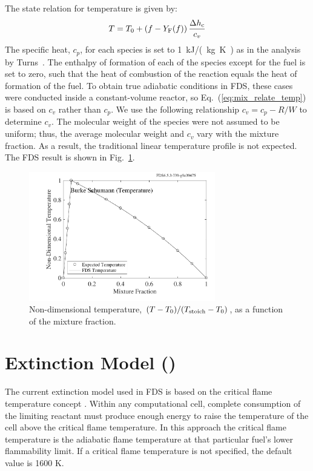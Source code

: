 \documentclass[11pt]{book}
\begin{document}
The state relation for temperature is given by:
\begin{equation}\label{eq:mix_relate_temp}
T = T_0 +  (f-Y_{\rm F}(f)) \, \frac{\Delta h_{\rm c}}{c_{v}}
\end{equation}
The specific heat, $c_p$, for each species is set to 1~\si{kJ/(kg.K)} as in the analysis by Turns~\cite{Turns:1996}. The enthalpy of formation of each of the species except for the fuel is set to zero, such that the heat of combustion of the reaction equals the heat of formation of the fuel. To obtain true adiabatic conditions in FDS, these cases were conducted inside a constant-volume reactor, so Eq.~(\ref{eq:mix_relate_temp}) is based on $c_v$ rather than $c_p$. We use the  following relationship $c_v = c_p - R/W$ to determine $c_v$. The molecular weight of the species were not assumed to be uniform; thus, the average molecular weight and $c_v$ vary with the mixture fraction. As a result, the traditional linear temperature profile is not expected.  The FDS result is shown in Fig.~\ref{fig:burke_schumann_temp}.
\begin{figure}
\begin{center}
\includegraphics[width=3.2in]{SCRIPT_FIGURES/burke_schumann_temp}
\end{center}
\caption[Mixture fraction state relation for temperature ()]{Non-dimensional temperature, $(T-T_0)/(T_{\rm stoich} - T_0)$, as a function of the mixture fraction.}
\label{fig:burke_schumann_temp}
\end{figure}


\clearpage

\section{Extinction Model ()}
\label{Extinct}

The current extinction model used in FDS is based on the critical flame temperature concept \cite{SFPE:Beyler}. Within any computational cell, complete consumption of the limiting reactant must produce enough energy to raise the temperature of the cell above the critical flame temperature. In this approach the critical flame temperature is the adiabatic flame temperature at that particular fuel's lower flammability limit. If a critical flame temperature is not specified, the default value is 1600 K.
\end{document}
